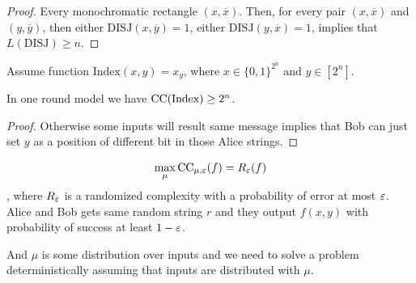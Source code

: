 \begin{proof}
	Every monochromatic rectangle $(x, \overline x)$. Then, for every pair $(x, \overline x)$ and $(y, \overline y)$, then either $\text{DISJ}(x, \overline y) = 1$, either $\text{DISJ}(y, \overline x) = 1$, implies that $L(\text{DISJ}) \geq n$.
\end{proof}

\begin{thm}
	Assume function $\text{Index}(x, y) = x_y$, where $x \in \{0, 1\}^{2^n}$ and $y \in [2^n]$.
	
	In one round model we have $\operatorname{CC}(\text{Index}) \geq 2^n$.
\end{thm}

\begin{proof}
	Otherwise some inputs will result same message implies that Bob can just set $y$ as a position of different bit in those Alice strings.
\end{proof}

\begin{lm}
	\begin{align*}
		\max_\mu \operatorname{CC}_{\mu, \varepsilon}(f) = R_\varepsilon(f)
	\end{align*}, where $R_\varepsilon$ is a randomized complexity with a probability of error at most $\varepsilon$. Alice and Bob gets same random string $r$ and they output $f(x, y)$ with probability of success at least $1 - \varepsilon$.
	
	And $\mu$ is some distribution over inputs and we need to solve a problem deterministically assuming that inputs are distributed with $\mu$.
\end{lm}

